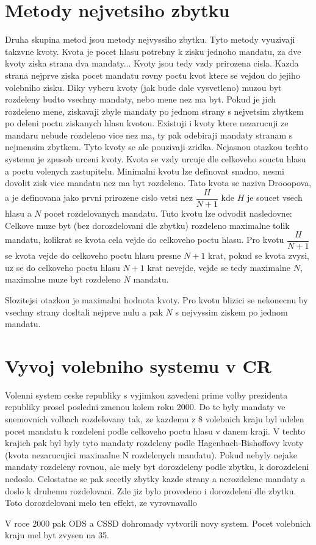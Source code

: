 \documentclass[12pt,a4paper]{article}
\begin{document}
\section{Metody nejvetsiho zbytku}
Druha skupina metod jsou metody nejvyssiho zbytku. Tyto metody vyuzivaji takzvne kvoty. Kvota je pocet hlasu potrebny k zisku jednoho mandatu, za dve kvoty ziska strana dva mandaty... Kvoty jsou tedy vzdy prirozena cisla. Kazda strana nejprve ziska pocet mandatu rovny poctu kvot ktere se vejdou do jejiho volebniho zisku. Diky vyberu kvoty (jak bude dale vysvetleno) muzou byt rozdeleny budto vsechny mandaty, nebo mene nez ma byt. Pokud je jich rozdeleno mene, ziskavaji zbyle mandaty po jednom strany s nejvetsim zbytkem po deleni poctu ziskanych hlasu kvotou. Existuji i kvoty ktere nezarucuji ze mandaru nebude rozdeleno vice nez ma, ty pak odebiraji mandaty stranam s nejmensim zbytkem. Tyto kvoty se ale pouzivaji zridka.
Nejasnou otazkou techto systemu je zpusob urceni kvoty. Kvota se vzdy urcuje dle celkoveho souctu hlasu a poctu volenych zastupitelu. Minimalni kvotu lze definovat snadno, nesmi dovolit zisk vice mandatu nez ma byt rozdeleno. Tato kvota se naziva Drooopova, a je definovana jako prvni prirozene cislo vetsi nez $\dfrac{H}{N+1}$ kde $H$ je soucet vsech hlasu a $N$ pocet rozdelovanych mandatu. Tuto kvotu lze odvodit nasledovne: Celkove muze byt (bez dorozdelovani dle zbytku) rozdeleno maximalne tolik mandatu, kolikrat se kvota cela vejde do celkoveho poctu hlasu. Pro kvotu $\dfrac{H}{N+1}$ se kvota vejde do celkoveho poctu hlasu presne $N+1$ krat, pokud se kvota zvysi, uz se do celkoveho poctu hlasu $N+1$ krat nevejde, vejde se tedy maximalne $N$, maximalne muze byt rozdeleno $N$ mandatu.

Slozitejsi otazkou je maximalni hodnota kvoty. Pro kvotu blizici se nekonecnu by vsechny strany dosltali nejprve nulu a pak $N$ s nejvyssim ziskem po jednom mandatu.

\section{Vyvoj volebniho systemu v CR}
Volenni system ceske republiky s vyjimkou zavedeni prime volby prezidenta republiky prosel posledni zmenou kolem roku 2000. Do te byly mandaty ve snemovnich volbach rozdelovany tak, ze kazdemu z 8 volebnich kraju byl udelen pocet mandatu k rozdeleni podle celkoveho poctu hlasu v danem kraji. V techto krajich pak byl byly tyto mandaty rozdeleny podle Hagenbach-Bishoffovy kvoty (kvota nezarucujici maximalne N rozdelenych mandatu). Pokud nebyly nejake mandaty rozdeleny rovnou, ale mely byt dorozdeleny podle zbytku, k dorozdeleni nedoslo. Celostatne se pak secetly zbytky kazde strany a nerozdelene mandaty a doslo k druhemu rozdelovani. Zde jiz bylo provedeno i dorozdeleni dle zbytku. Toto dorozdelovani melo ten effekt, ze vyrovnavallo %

V roce 2000 pak ODS a CSSD dohromady vytvorili novy system. Pocet volebnich kraju mel byt zvysen na 35. 
\end{document}
